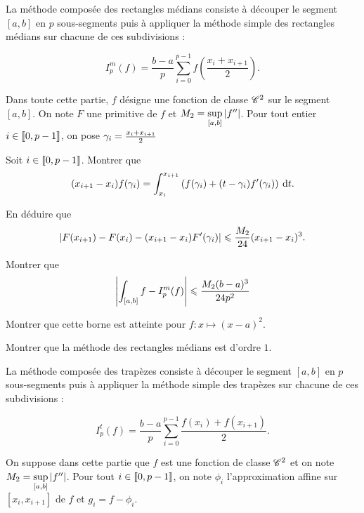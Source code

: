 \documentclass[oneside,11pt]{book}
\begin{document}
\begin{refsection}
\begin{probleme*}

La méthode composée des rectangles médians consiste à découper le segment $[a, b]$ en $p$ sous-segments puis à appliquer la méthode simple des rectangles médians sur chacune de ces subdivisions :
\begin{colonnes}{2}
\[
I_p^m(f) = \frac{b-a}{p} \sum_{i=0}^{p-1} f\left(\frac{x_i + x_{i+1}}{2} \right).
\]
%
\columnbreak
%
\begin{center}
\scalebox{0.3}{}
\end{center}
\end{colonnes}

Dans toute cette partie, $f$ désigne une fonction de classe $\mathscr{C}^2$ sur le segment $[a, b]$. On note $F$ une primitive de $f$ et $M_2 = \sup\limits_{[a,b]} \left\lvert f''\right\rvert$. Pour tout entier $i \in \llbracket0,p-1\rrbracket$, on pose $\gamma_i = \frac{x_i + x_{i+1}}{2}$

\qu Soit $i \in \llbracket0,p-1\rrbracket$.
\squ Montrer que
\[
(x_{i+1} - x_i) f(\gamma_i) = \displaystyle \int_{x_i}^{x_{i+1}} \left(f(\gamma_i) + (t - \gamma_i) f'(\gamma_i) \right) \:{\text d}t.
\]

\squ En déduire que
\[
\left\lvert F(x_{i+1}) - F(x_i) - (x_{i+1} - x_i) F'(\gamma_i)\right\rvert
\leqslant \frac{M_2}{24} (x_{i+1} - x_i)^3.
\]

\qu Montrer que
\[
\left\lvert\int_{[a,b]} f - I_p^m(f)\right\rvert \leqslant \frac{M_2 (b-a)^3}{24 p^2}
\]

\qu Montrer que cette borne est atteinte pour $f : x \mapsto (x - a)^2$.

\qu Montrer que la méthode des rectangles médians est d'ordre $1$.



La méthode composée des trapèzes consiste à découper le segment $[a, b]$ en $p$ sous-segments puis à appliquer la méthode simple des trapèzes sur chacune de ces subdivisions :
\begin{colonnes}{2}
\[
I_p^t(f) =  \frac{b-a}{p} \sum_{i=0}^{p-1} \frac{f(x_i) + f(x_{i+1})}{2}.
\]
%
\columnbreak
%
\begin{center}
\scalebox{0.3}{}
\end{center}
\end{colonnes}

On suppose dans cette partie que $f$ est une fonction de classe $\mathscr{C}^2$ et on note $M_2 = \sup\limits_{[a,b]} \left\lvert f''\right\rvert$. Pour tout $i \in \llbracket0,p-1\rrbracket$, on note $\phi_i$ l'approximation affine sur $[x_i, x_{i+1}]$ de $f$ et $g_i = f - \phi_i$.


\end{probleme*}
\end{refsection}
\end{document}

